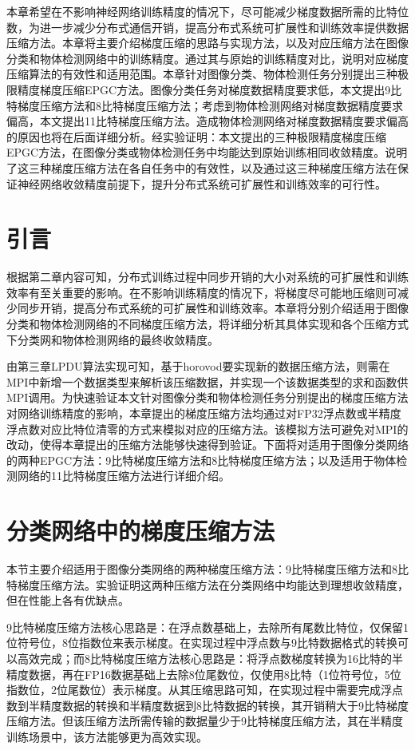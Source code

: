 本章希望在不影响神经网络训练精度的情况下，尽可能减少梯度数据所需的比特位数，为进一步减少分布式通信开销，提高分布式系统可扩展性和训练效率提供数据压缩方法。本章将主要介绍梯度压缩的思路与实现方法，以及对应压缩方法在图像分类和物体检测网络中的训练精度。通过其与原始的训练精度对比，说明对应梯度压缩算法的有效性和适用范围。本章针对图像分类、物体检测任务分别提出三种极限精度梯度压缩EPGC方法。图像分类任务对梯度数据精度要求低，本文提出9比特梯度压缩方法和8比特梯度压缩方法；考虑到物体检测网络对梯度数据精度要求偏高，本文提出11比特梯度压缩方法。造成物体检测网络对梯度数据精度要求偏高的原因也将在后面详细分析。经实验证明：本文提出的三种极限精度梯度压缩EPGC方法，在图像分类或物体检测任务中均能达到原始训练相同收敛精度。说明了这三种梯度压缩方法在各自任务中的有效性，以及通过这三种梯度压缩方法在保证神经网络收敛精度前提下，提升分布式系统可扩展性和训练效率的可行性。
\section{引言}
根据第二章内容可知，分布式训练过程中同步开销的大小对系统的可扩展性和训练效率有至关重要的影响。在不影响训练精度的情况下，将梯度尽可能地压缩则可减少同步开销，提高分布式系统的可扩展性和训练效率。本章将分别介绍适用于图像分类和物体检测网络的不同梯度压缩方法，将详细分析其具体实现和各个压缩方式下分类网和物体检测网络的最终收敛精度。

由第三章LPDU算法实现可知，基于horovod要实现新的数据压缩方法，则需在MPI中新增一个数据类型来解析该压缩数据，并实现一个该数据类型的求和函数供MPI调用。为快速验证本文针对图像分类和物体检测任务分别提出的梯度压缩方法对网络训练精度的影响，本章提出的梯度压缩方法均通过对FP32浮点数或半精度浮点数对应比特位清零的方式来模拟对应的压缩方法。该模拟方法可避免对MPI的改动，使得本章提出的压缩方法能够快速得到验证。下面将对适用于图像分类网络的两种EPGC方法：9比特梯度压缩方法和8比特梯度压缩方法；以及适用于物体检测网络的11比特梯度压缩方法进行详细介绍。
\section{分类网络中的梯度压缩方法}
本节主要介绍适用于图像分类网络的两种梯度压缩方法：9比特梯度压缩方法和8比特梯度压缩方法。实验证明这两种压缩方法在分类网络中均能达到理想收敛精度，但在性能上各有优缺点。

9比特梯度压缩方法核心思路是：在浮点数基础上，去除所有尾数比特位，仅保留1位符号位，8位指数位来表示梯度。在实现过程中浮点数与9比特数据格式的转换可以高效完成；而8比特梯度压缩方法核心思路是：将浮点数梯度转换为16比特的半精度数据，再在FP16数据基础上去除8位尾数位，仅使用8比特（1位符号位，5位指数位，2位尾数位）表示梯度。从其压缩思路可知，在实现过程中需要完成浮点数到半精度数据的转换和半精度数据到8比特数据的转换，其开销稍大于9比特梯度压缩方法。但该压缩方法所需传输的数据量少于9比特梯度压缩方法，其在半精度训练场景中，该方法能够更为高效实现。
